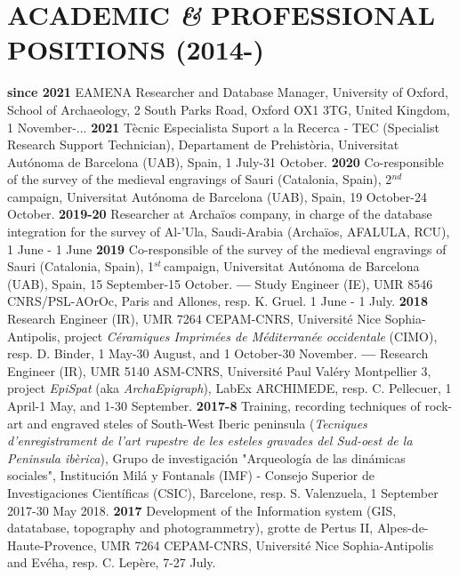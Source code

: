 \documentclass{article}
\begin{document}
\section{ACADEMIC \textit{\&} PROFESSIONAL POSITIONS (2014-)}

\textbf{since 2021 }EAMENA Researcher and Database Manager, University of Oxford, School of Archaeology, 2 South Parks Road, Oxford OX1 3TG, United Kingdom, 1 November-...
\smallbreak
\textbf{2021 }T\`{e}cnic Especialista Suport a la Recerca - TEC (Specialist Research Support Technician), Departament de Prehist\`oria, Universitat Aut\'{o}noma de Barcelona (UAB), Spain, 1 July-31 October.
\smallbreak
\textbf{2020 }Co-responsible of the survey of the medieval engravings of Sauri (Catalonia, Spain), 2${}^{nd\ }$campaign, Universitat Aut\'{o}noma de Barcelona (UAB), Spain, 19 October-24 October.
\smallbreak
\textbf{2019-20 }Researcher at Archa\"{i}os company, in charge of the database integration for the survey of Al-'Ula, Saudi-Arabia (Archa\"{i}os, AFALULA, RCU), 1 June - 1 June
\smallbreak
\textbf{2019 }Co-responsible of the survey of the medieval engravings of Sauri (Catalonia, Spain), 1${}^{st\ }$campaign, Universitat Aut\'{o}noma de Barcelona (UAB), Spain, 15 September-15 October.
\smallbreak
\textbf{--- }Study Engineer (IE), UMR 8546 CNRS/PSL-AOrOc, Paris and Allones, resp. K. Gruel. 1 June - 1 July.
\smallbreak
\textbf{2018 }Research Engineer (IR), UMR 7264 CEPAM-CNRS, Universit\'{e} Nice Sophia-Antipolis, project \textit{C\'{e}ramiques Imprim\'{e}es de M\'{e}diterran\'{e}e occidentale} (CIMO), resp. D. Binder, 1 May-30 August, and 1 October-30 November.
\smallbreak
\textbf{--- }Research Engineer (IR), UMR 5140 ASM-CNRS, Universit\'{e} Paul Val\'{e}ry Montpellier 3, project \textit{EpiSpat} (aka \textit{ArchaEpigraph}), LabEx ARCHIMEDE, resp. C. Pellecuer, 1 April-1 May, and 1-30 September.
\smallbreak
\textbf{2017-8 }Training, recording techniques of rock-art and engraved steles of South-West Iberic peninsula (\textit{Tecniques d'enregistrament de l'art rupestre de les esteles gravades del Sud-oest de la Peninsula ibèrica}), Grupo de investigaci\'{o}n "Arqueolog\'{i}a de las din\'{a}micas sociales", Instituci\'{o}n Mil\'{a} y Fontanals (IMF) - Consejo Superior de Investigaciones Cient\'{i}ficas (CSIC), Barcelone, resp. S. Valenzuela, 1 September 2017-30 May 2018.
\smallbreak
\textbf{2017 }Development of the Information system (GIS, datatabase, topography and photogrammetry), grotte de Pertus II, Alpes-de-Haute-Provence, UMR 7264 CEPAM-CNRS, Universit\'{e} Nice Sophia-Antipolis and Ev\'{e}ha, resp. C. Lep\`{e}re, 7-27 July.
\end{document}
